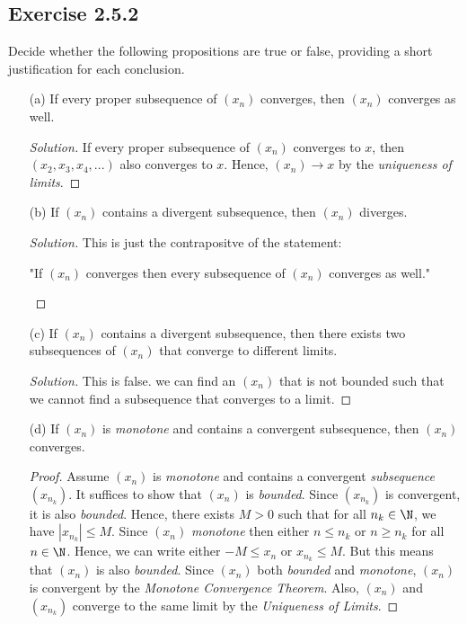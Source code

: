 \subsection{Exercise 2.5.2}
Decide whether the following propositions are true or false, providing a short justification for each conclusion.
\begin{enumerate}
    \item[(a)] If every proper subsequence of \( (x_n)\) converges, then \((x_n)\) converges as well.
        \begin{proof}[Solution]
            If every proper subsequence of \((x_n)\) converges to \(x\), then \((x_2, x_3, x_4, ...)\) also converges to \(x\). Hence, \((x_n) \to x\) by the \textit{uniqueness of limits}.
        \end{proof}
    \item[(b)] If \( (x_n)\) contains a divergent subsequence, then \( (x_n)\) diverges.
        \begin{proof}[Solution]
        This is just the contrapositve of the statement: 
        \begin{center}
            "If \( (x_n)\) converges then every subsequence of \( (x_n)\) converges as well."
        \end{center}
        \end{proof}
    \item[(c)] If \( (x_n)\) contains a divergent subsequence, then there exists two subsequences of \( (x_n)\) that converge to different limits. 
        \begin{proof}[Solution]
        This is false. we can find an \((x_n)\) that is not bounded such that we cannot find a subsequence that converges to a limit. 
        \end{proof}
    \item[(d)] If \((x_n)\) is \textit{monotone} and contains a convergent subsequence, then \((x_n)\) converges.
        \begin{proof}
            Assume \( (x_n)\) is \textit{monotone} and contains a convergent \textit{subsequence} \((x_{n_k})\). It suffices to show that \( (x_n)\) is \textit{bounded}. Since \((x_{n_k})\) is convergent, it is also \textit{bounded}. Hence, there exists \(M > 0 \) such that for all \(n_k \in \N \), we have \(|x_{n_k}| \leq M \). Since \((x_n)\) \textit{monotone} then either \(n \leq n_k \) or \( n \geq n_k\) for all \( n \in \N \). Hence, we can write either \(-M \leq x_n \) or \(x_{n_k} \leq M \). But this means that \((x_n)\) is also \textit{bounded}. Since \((x_n)\) both \textit{bounded} and \textit{monotone}, \((x_n)\) is convergent by the \textit{Monotone Convergence Theorem}. Also, \((x_n)\) and \((x_{n_k})\) converge to the same limit by the \textit{Uniqueness of Limits}.
        \end{proof}
\end{enumerate}

